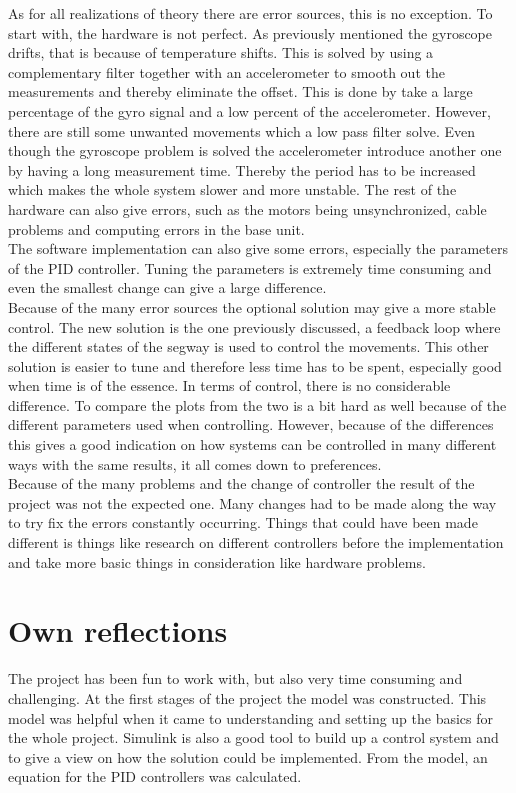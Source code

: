 \documentclass[a4paper]{article}
\begin{document}
As for all realizations of theory there are error sources, this is no exception. To start with, the hardware is not perfect. As previously mentioned the gyroscope drifts, that is because of temperature shifts. This is solved by using a complementary filter together with an accelerometer to smooth out the measurements and thereby eliminate the offset. This is done by take a large percentage of the gyro signal and a low percent of the accelerometer. However, there are still some unwanted movements which a low pass filter solve. Even though the gyroscope problem is solved the accelerometer introduce another one by having a long measurement time. Thereby the period has to be increased which makes the whole system slower and more unstable. The rest of the hardware can also give errors, such as the motors being unsynchronized, cable problems and computing errors in the base unit.\\

The software implementation can also give some errors, especially the parameters of the PID controller. Tuning the parameters is extremely time consuming and even the smallest change can give a large difference.\\

Because of the many error sources the optional solution may give a more stable control. The new solution is the one previously discussed, a feedback loop where the different states of the segway is used to control the movements. This other solution is easier to tune and therefore less time has to be spent, especially good when time is of the essence. In terms of control, there is no considerable difference. To compare the plots from the two is a bit hard as well because of the different parameters used when controlling. However, because of the differences this gives a good indication on how systems can be controlled in many different ways with the same results, it all comes down to preferences. \\

Because of the many problems and the change of controller the result of the project was not the expected one. Many changes had  to be made along the way to try fix the errors constantly occurring. Things that could have been made different is things like research on different controllers before the implementation and take more basic things in consideration like hardware problems.  


\section{Own reflections}
The project has been fun to work with, but also very time consuming and challenging. At the first stages of the project the model was constructed. This model was helpful when it came to understanding and setting up the basics for the whole project. Simulink is also a good tool to build up a control system and to give a view on how the solution could be implemented. From the model, an equation for the PID controllers was calculated. \\
\end{document}
